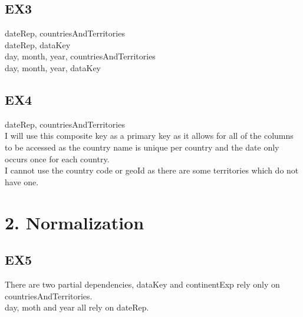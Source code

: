 \documentclass{article}
\begin{document}
\subsection{EX3}
dateRep, countriesAndTerritories\\
dateRep, dataKey\\
day, month, year, countriesAndTerritories\\
day, month, year, dataKey\\

\subsection{EX4}
dateRep, countriesAndTerritories\\
I will use this composite key as a primary key as it allows for all of the columns to be accessed as the country name is unique per country and the date only occurs once for each country.\\
I cannot use the country code or geoId as there are some territories which do not have one.\\

\section{2. Normalization}
\subsection{EX5}
There are two partial dependencies, dataKey and continentExp rely only on countriesAndTerritories.\\
day, moth and year all rely on dateRep.\\
\end{document}
